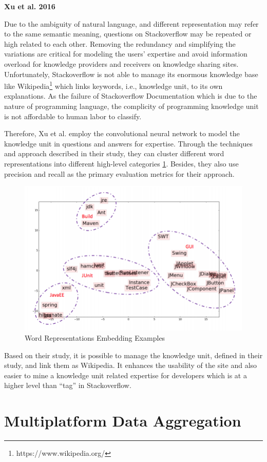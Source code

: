 \textbf{Xu et al. 2016}

Due to the ambiguity of natural language, and different representation may refer to the same semantic meaning, questions on Stackoverflow may be repeated or high related to each other. Removing the redundancy and simplifying the variations are critical for modeling the users' expertise and avoid information overload for knowledge providers and receivers on knowledge sharing sites. Unfortunately, Stackoverflow is not able to manage its enormous knowledge base like Wikipedia\footnote{https://www.wikipedia.org/} which links keywords, i.e., knowledge unit, to its own explanations. As the failure of Stackoverflow Documentation which is due to the nature of programming language, the complicity of programming knowledge unit is not affordable to human labor to classify.

Therefore, Xu et al. employ the convolutional neural network to model the knowledge unit in questions and answers for expertise. Through the techniques and approach described in their study, they can cluster different word representations into different high-level categories \ref{knowledgeUnit}. Besides, they also use precision and recall as the primary evaluation metrics for their approach.

\begin{figure}
\includegraphics[width = 0.5\columnwidth]{KnowledgeUnit.png}
\centering
\caption{Word Representations Embedding Examples \cite{xu2016predicting}}
\label{knowledgeUnit}
\end{figure}

Based on their study, it is possible to manage the knowledge unit, defined in their study, and link them as Wikipedia. It enhances the usability of the site and also easier to mine a knowledge unit related expertise for developers which is at a higher level than ``tag'' in Stackoverflow.

\section{Multiplatform Data Aggregation}

